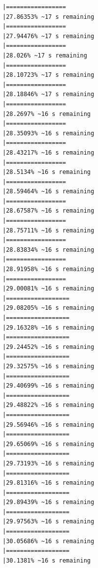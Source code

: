 \documentclass{article}\usepackage[]{graphicx}\usepackage[]{xcolor}
\makeatletter
\newenvironment{kframe}{%
 \def\at@end@of@kframe{}%
 \ifinner\ifhmode%
  \def\at@end@of@kframe{\end{minipage}}%
  \begin{minipage}{\columnwidth}%
 \fi\fi%
 \def\FrameCommand##1{\hskip\@totalleftmargin \hskip-\fboxsep
 \colorbox{shadecolor}{##1}\hskip-\fboxsep
     \hskip-\linewidth \hskip-\@totalleftmargin \hskip\columnwidth}%
 \MakeFramed {\advance\hsize-\width
   \@totalleftmargin\z@ \linewidth\hsize
   \@setminipage}}%
 {\par\unskip\endMakeFramed%
 \at@end@of@kframe}
\newenvironment{knitrout}{}{} %
\makeatother
\begin{document}
\begin{knitrout}
\begin{kframe}
\begin{verbatim}
|=================                                             |27.86353% ~17 s remaining 
|=================                                             |27.94476% ~17 s remaining 
|=================                                             |28.026% ~17 s remaining   
|=================                                             |28.10723% ~17 s remaining 
|=================                                             |28.18846% ~17 s remaining 
|=================                                             |28.2697% ~16 s remaining  
|=================                                             |28.35093% ~16 s remaining 
|=================                                             |28.43217% ~16 s remaining 
|=================                                             |28.5134% ~16 s remaining  
|=================                                             |28.59464% ~16 s remaining 
|=================                                             |28.67587% ~16 s remaining 
|=================                                             |28.75711% ~16 s remaining 
|=================                                             |28.83834% ~16 s remaining 
|=================                                             |28.91958% ~16 s remaining 
|=================                                             |29.00081% ~16 s remaining 
|==================                                            |29.08205% ~16 s remaining 
|==================                                            |29.16328% ~16 s remaining 
|==================                                            |29.24452% ~16 s remaining 
|==================                                            |29.32575% ~16 s remaining 
|==================                                            |29.40699% ~16 s remaining 
|==================                                            |29.48822% ~16 s remaining 
|==================                                            |29.56946% ~16 s remaining 
|==================                                            |29.65069% ~16 s remaining 
|==================                                            |29.73193% ~16 s remaining 
|==================                                            |29.81316% ~16 s remaining 
|==================                                            |29.89439% ~16 s remaining 
|==================                                            |29.97563% ~16 s remaining 
|==================                                            |30.05686% ~16 s remaining 
|==================                                            |30.1381% ~16 s remaining  

\end{verbatim}
\end{kframe}
\end{knitrout}
\end{document}
